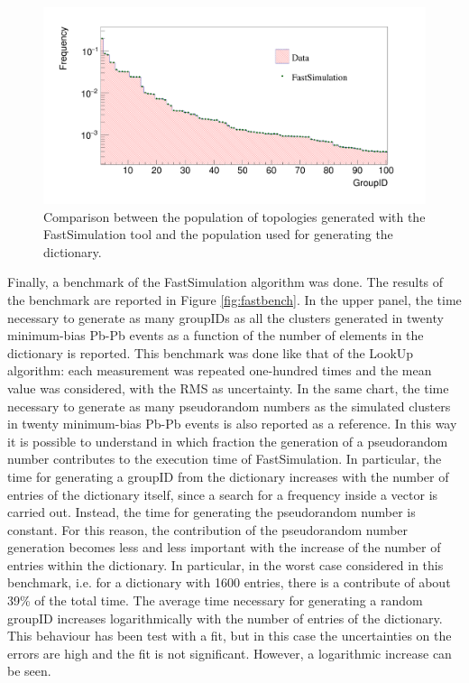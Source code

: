 \begin{figure}
  \centering
  \includegraphics[scale=0.2]{figures/fastcomp.png}
  \caption{Comparison between the population of topologies generated with the FastSimulation tool and the population used for generating the dictionary.}
  \label{fig:fastcomp}
\end{figure}
%
Finally, a benchmark of the FastSimulation algorithm was done. The results of the benchmark are reported in Figure \ref{fig:fastbench}. In the upper panel, the time necessary to generate as many groupIDs as all the clusters generated in twenty minimum-bias Pb-Pb events as a function of the number of elements in the dictionary is reported. This benchmark was done like that of the LookUp algorithm: each measurement was repeated one-hundred times and the mean value was considered, with the RMS as uncertainty. In the same chart, the time necessary to generate as many pseudorandom numbers as the simulated clusters in twenty minimum-bias Pb-Pb events is also reported as a reference. In this way it is possible to understand in which fraction the generation of a pseudorandom number contributes to the execution time of FastSimulation. In particular, the time for generating a groupID from the dictionary increases with the number of entries of the dictionary itself, since a search for a frequency inside a vector is carried out. Instead, the time for generating the pseudorandom number is constant. For this reason, the contribution of the pseudorandom number generation becomes less and less important with the increase of the number of entries within the dictionary. In particular, in the worst case considered in this benchmark, i.e. for a dictionary with 1600 entries, there is a contribute of about 39\% of the total time. The average time necessary for generating a random groupID increases logarithmically with the number of entries of the dictionary. This behaviour has been test with a fit, but in this case the uncertainties on the errors are high and the fit is not significant. However, a logarithmic increase can be seen.\\
